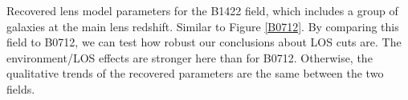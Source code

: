 \label{B1422} Recovered lens model parameters for the B1422 field, which includes a group of galaxies at the main lens redshift. Similar to Figure \ref{B0712}. By comparing this field to B0712, we can test how robust our conclusions about LOS cuts are. The environment/LOS effects are stronger here than for B0712. Otherwise, the qualitative trends of the recovered parameters are the same between the two fields.